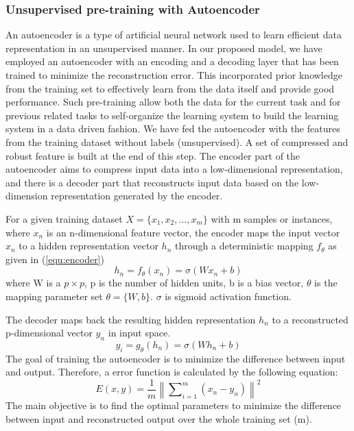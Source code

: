 \documentclass[runningheads]{llncs}
\newcommand{\equ}[1]{(\ref{#1})}
\newcommand\norm[1]{\left\lVert#1\right\rVert}
\begin{document}
   
\subsubsection{ Unsupervised pre-training with Autoencoder}
An autoencoder is a type of artificial neural network used to learn efficient data representation in an unsupervised manner. In our proposed model, we have employed an autoencoder with an encoding and a decoding layer  that has been trained to minimize the reconstruction error. This incorporated prior knowledge from the training set to effectively learn from the data itself and provide good performance. Such pre-training allow both the data for the current task and for previous related tasks to self-organize the learning system to build the learning system in a data driven fashion. We have fed the autoencoder with the features from the training dataset without labels (unsupervised). A set of compressed and robust feature is built at the end of this step. The encoder part of the autoencoder aims to compress input data into a low-dimensional
representation, and there is a decoder part that reconstructs input data based on the low-dimension representation generated by the encoder.

For a given training dataset $X = \{x_1, x_2, ..., x_m\}$ with
m samples or instances, where $x_n$ is an n-dimensional feature vector, the
encoder maps the input vector $x_n$ to a hidden representation
vector $h_n$ through a deterministic mapping $f_{\theta}$ as given in \equ{equ:encoder}
\begin{equation}
\label{equ:encoder}
h_n = f_{\theta}(x_n) = \sigma(W x_{n} + b)
\end{equation}
where W is a $p \times p$, p is the number of hidden units, b is a bias vector, $\theta$ is the mapping parameter set $\theta = \{W, b\}$. $\sigma$ is sigmoid activation function.

The decoder maps back the resulting hidden representation
$h_n$ to a reconstructed p-dimensional vector $y_n$ in input space.
\begin{equation}
\label{equ:encoder1}
y_i = g_{\theta}(h_n) = \sigma(W h_{n} + b)
\end{equation}
The goal of training the autoencoder is to minimize the
difference between input and output. Therefore, a error function
is calculated by the following equation:
\begin{equation} E(x,y)= {\frac{1}{m}}\norm{\sum\nolimits_{i=1}^{m}(x_{n}-y_{n})}^{2} \end{equation}
The main objective is to find the optimal parameters to minimize the difference between input and reconstructed output over the whole training set (m).
\end{document}
